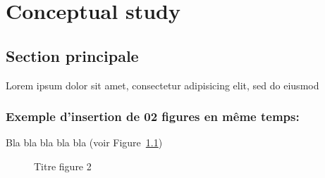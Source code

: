 \chapter{Conceptual study}

\section{Section principale}
Lorem ipsum dolor sit amet, consectetur adipisicing elit, sed do eiusmod

\subsection{Exemple d'insertion de 02 figures en même temps:}

Bla bla bla bla bla (voir Figure~\ref{fig:Nature})
\begin{figure}[ht]
	\centering
	\vspace*{13pt}
	\caption{Titre figure 2} 
	\label{fig:Nature}
\end{figure} 


